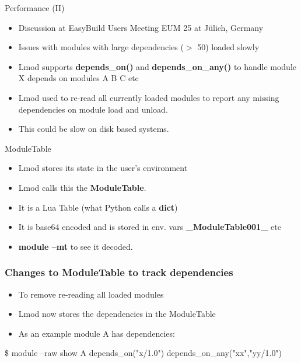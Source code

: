 \documentclass[aspectratio=169]{beamer}
\begin{document}
\begin{frame}{Performance (II)}
  \begin{itemize}
    \item Discussion at EasyBuild Users Meeting EUM 25 at J{\"u}lich, Germany
    \item Issues with modules with large dependencies ($>$ 50) loaded
      slowly
    \item Lmod supports \textbf{depends\_on()} and
      \textbf{depends\_on\_any()} to handle module X depends on modules
      A B C etc
    \item Lmod used to re-read all currently loaded modules to report
      any missing dependencies on module load and unload.
    \item This could be slow on disk based systems.
  \end{itemize}
\end{frame}


\begin{frame}{ModuleTable}
  \begin{itemize}
    \item Lmod stores its state in the user's environment
    \item Lmod calls this the \textbf{ModuleTable}.
    \item It is a Lua Table (what Python calls a \textbf{dict})
    \item It is base64 encoded and is stored in env. vars \textbf{\_ModuleTable001\_} etc
    \item \textbf{module --mt} to see it decoded.
  \end{itemize}
\end{frame}

\begin{frame}[fragile]
    \frametitle{Changes to ModuleTable to track dependencies}
  \begin{itemize}
    \item To remove re-reading all loaded modules
    \item Lmod now stores the dependencies in the ModuleTable 
    \item As an example module A has dependencies:
  \end{itemize}
 {\small
    \begin{semiverbatim}
\$ module --raw show A
depends_on("x/1.0")
depends_on_any("xx","yy/1.0")
    \end{semiverbatim}
}
\end{frame}
\end{document}
